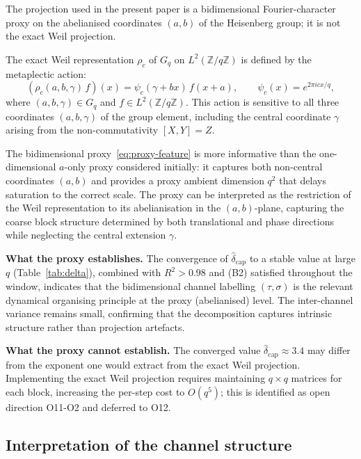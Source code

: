 \documentclass[11pt,a4paper]{article}
\newcommand{\dcap}{\delta_{\mathrm{cap}}}
\begin{document}
    The projection used in the present paper is a bidimensional Fourier-character proxy on the
    abelianised coordinates $(a,b)$ of the Heisenberg group; it is not the exact Weil projection.

    The exact Weil representation $\rho_c$ of $G_q$ on $L^2(\mathbb{Z}/q\mathbb{Z})$ is defined
    by the metaplectic action:
    \begin{equation}
      \label{eq:weil-action}
      (\rho_c(a,b,\gamma)\,f)(x) = \psi_c(\gamma + bx)\,f(x + a),
      \qquad \psi_c(x) = e^{2\pi i cx/q},
    \end{equation}
    where $(a, b, \gamma) \in G_q$ and $f \in L^2(\mathbb{Z}/q\mathbb{Z})$.
    This action is sensitive to all three coordinates $(a, b, \gamma)$ of the group element,
    including the central coordinate $\gamma$ arising from the non-commutativity $[X,Y] = Z$.

    The bidimensional proxy~\eqref{eq:proxy-feature} is more informative than the
    one-dimensional $a$-only proxy considered initially: it captures both non-central
    coordinates $(a,b)$ and provides a proxy ambient dimension $q^2$ that delays saturation to
    the correct scale.
    The proxy can be interpreted as the restriction of the Weil representation to its
    abelianisation in the $(a,b)$-plane, capturing the coarse block structure determined by
    both translational and phase directions while neglecting the central extension $\gamma$.

    \textbf{What the proxy establishes.}
    The convergence of $\hat\dcap$ to a stable value at large $q$ (Table~\ref{tab:delta}),
    combined with $R^2 > 0.98$ and (B2) satisfied throughout the window, indicates that the
    bidimensional channel labelling $(\tau,\sigma)$ is the relevant dynamical organising principle
    at the proxy (abelianised) level.
    The inter-channel variance remains small, confirming that the decomposition captures
    intrinsic structure rather than projection artefacts.

    \textbf{What the proxy cannot establish.}
    The converged value $\hat\dcap \approx 3.4$ may differ from the exponent one would extract
    from the exact Weil projection.
    Implementing the exact Weil projection requires maintaining $q \times q$ matrices for each
    block, increasing the per-step cost to $O(q^5)$; this is identified as open direction O11-O2
    and deferred to O12.

  \subsection{Interpretation of the channel structure}
    \label{sec:disc-interpretation}
\end{document}
